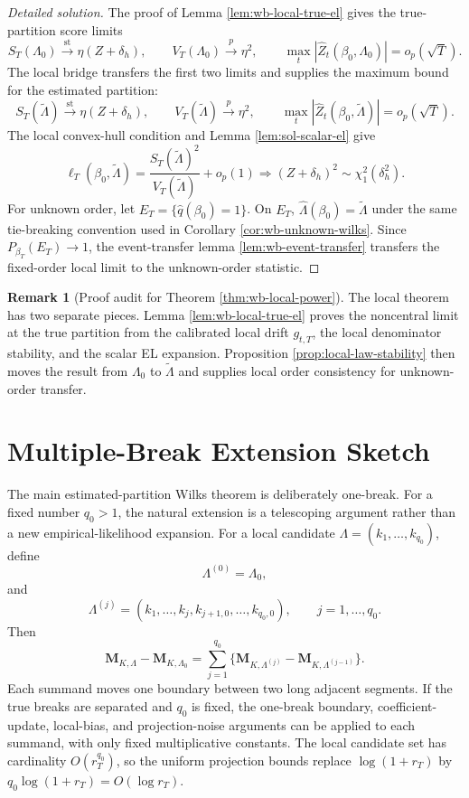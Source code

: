 \documentclass[12pt]{article}
\numberwithin{equation}{section}
\theoremstyle{definition}
\newtheorem{remark}{Remark}
\begin{document}
\begin{proof}[Detailed solution]
The proof of Lemma \ref{lem:wb-local-true-el} gives the true-partition score
limits
\[
    S_T(\Lambda_0)\xrightarrow{\mathrm{st}}\eta(Z+\delta_h),
    \qquad
    V_T(\Lambda_0)\xrightarrow{p}\eta^2,
    \qquad
    \max_t|\widehat Z_t(\beta_0,\Lambda_0)|=o_p(\sqrt T).
\]
The local bridge transfers the first two limits and supplies the maximum bound
for the estimated partition:
\[
    S_T(\widetilde\Lambda)\xrightarrow{\mathrm{st}}\eta(Z+\delta_h),
    \qquad
    V_T(\widetilde\Lambda)\xrightarrow{p}\eta^2,
    \qquad
    \max_t|\widehat Z_t(\beta_0,\widetilde\Lambda)|=o_p(\sqrt T).
\]
The local convex-hull condition and Lemma \ref{lem:sol-scalar-el} give
\[
    \ell_T(\beta_0,\widetilde\Lambda)
    =\frac{S_T(\widetilde\Lambda)^2}{V_T(\widetilde\Lambda)}+o_p(1)
    \Rightarrow (Z+\delta_h)^2\sim\chi_1^2(\delta_h^2).
\]
For unknown order, let \(E_T=\{\widehat q(\beta_0)=1\}\).  On \(E_T\),
\(\widehat\Lambda(\beta_0)=\widetilde\Lambda\) under the same tie-breaking
convention used in Corollary \ref{cor:wb-unknown-wilks}.  Since
\(P_{\beta_T}(E_T)\to1\), the event-transfer lemma
\ref{lem:wb-event-transfer} transfers the fixed-order local limit to the
unknown-order statistic.
\end{proof}

\begin{remark}[Proof audit for Theorem \ref{thm:wb-local-power}]
The local theorem has two separate pieces.  Lemma \ref{lem:wb-local-true-el}
proves the noncentral limit at the true partition from the calibrated local
drift \(g_{t,T}\), the local denominator stability, and the scalar EL expansion.
Proposition \ref{prop:local-law-stability} then moves the result from
\(\Lambda_0\) to \(\widetilde\Lambda\) and supplies local order consistency for
unknown-order transfer.
\end{remark}

\section{Multiple-Break Extension Sketch}
\label{sec:multiple-break-sketch}

The main estimated-partition Wilks theorem is deliberately one-break.  For a
fixed number \(q_0>1\), the natural extension is a telescoping argument rather
than a new empirical-likelihood expansion.  For a local candidate
\(\Lambda=(k_1,\ldots,k_{q_0})\), define
\[
    \Lambda^{(0)}=\Lambda_0,
\]
and
\[
    \Lambda^{(j)}
    =(k_1,\ldots,k_j,k_{j+1,0},\ldots,k_{q_0,0}),
    \qquad j=1,\ldots,q_0.
\]
Then
\[
    \bm M_{K,\Lambda}-\bm M_{K,\Lambda_0}
    =
    \sum_{j=1}^{q_0}
    \{\bm M_{K,\Lambda^{(j)}}-
      \bm M_{K,\Lambda^{(j-1)}}\}.
\]
Each summand moves one boundary between two long adjacent segments.  If the
true breaks are separated and \(q_0\) is fixed, the one-break boundary,
coefficient-update, local-bias, and projection-noise arguments can be applied to
each summand, with only fixed multiplicative constants.  The local candidate set
has cardinality \(O(r_T^{q_0})\), so the uniform projection bounds replace
\(\log(1+r_T)\) by \(q_0\log(1+r_T)=O(\log r_T)\).
\end{document}
